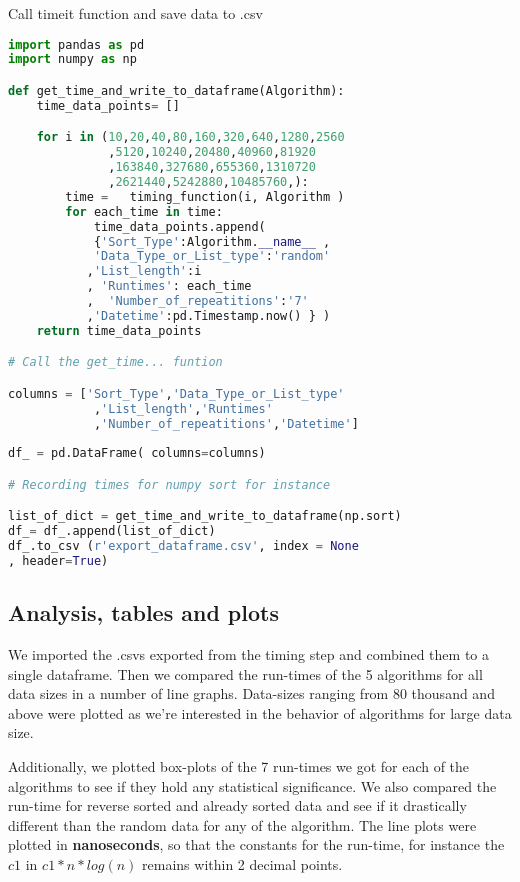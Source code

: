 \documentclass[sigconf, nonacm, natbib, screen, balance=False]{acmart}
\begin{document}
\begin{listing}
  \caption{Call timeit function and save data to .csv}
  \label{call time_it function}
\begin{lstlisting}[language=Python]
import pandas as pd
import numpy as np

def get_time_and_write_to_dataframe(Algorithm):
    time_data_points= []

    for i in (10,20,40,80,160,320,640,1280,2560
              ,5120,10240,20480,40960,81920
              ,163840,327680,655360,1310720
              ,2621440,5242880,10485760,):
        time =   timing_function(i, Algorithm ) 
        for each_time in time:
            time_data_points.append( 
            {'Sort_Type':Algorithm.__name__ ,
            'Data_Type_or_List_type':'random'
           ,'List_length':i
           , 'Runtimes': each_time 
           ,  'Number_of_repeatitions':'7'
           ,'Datetime':pd.Timestamp.now() } )
    return time_data_points   

# Call the get_time... funtion 

columns = ['Sort_Type','Data_Type_or_List_type'
            ,'List_length','Runtimes'
            ,'Number_of_repeatitions','Datetime']
            
df_ = pd.DataFrame( columns=columns)

# Recording times for numpy sort for instance

list_of_dict = get_time_and_write_to_dataframe(np.sort)
df_= df_.append(list_of_dict)
df_.to_csv (r'export_dataframe.csv', index = None
, header=True)
\end{lstlisting}
\end{listing}

\subsection{Analysis, tables and plots}\label{sec:analysis}
We imported the .csvs exported from the timing step and combined them to a single dataframe. Then we compared the run-times of the 5 algorithms for all data sizes in a number of line graphs. Data-sizes ranging from 80 thousand and above were plotted as we're interested in the behavior of algorithms for large data size. 

Additionally, we plotted box-plots of the 7 run-times we got for each of the algorithms to see if they hold any statistical significance. We also compared the run-time for reverse sorted and already sorted data and see if it drastically different than the random data for any of the algorithm. The line plots were plotted in \textbf{nanoseconds}, so that the constants for the run-time, for instance the $c1$ in  $c1*n*log(n)$ remains within 2 decimal points.
\end{document}
